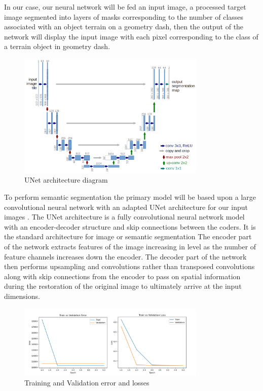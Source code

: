 \documentclass{article} %
\begin{document}
In our case, our neural network will be fed an input image, a processed target image segmented into layers of masks corresponding to the number of classes associated with an object terrain on a geometry dash, then the output of the network will display the input image with each pixel corresponding to the class of a terrain object in geometry dash. 

\begin{figure}[!h]
\begin{center}
\includegraphics[width=0.8\textwidth]{Figs/u-net-architecture.png}
\end{center}
\caption{UNet architecture diagram}
\label{fig:collision_box_issues}
\end{figure}

To perform semantic segmentation the primary model will be based upon a large convolutional neural network with an adapted UNet architecture for our input images \cite{ronneberger2015unetconvolutionalnetworksbiomedical}. The UNet architecture is a fully convolutional neural network model with an encoder-decoder structure and skip connections between the coders. It is the standard architecture for image or semantic segmentation The encoder part of the network extracts features of the image increasing in level as the number of feature channels increases down the encoder. The decoder part of the network then performs upsampling and convolutions rather than transposed convolutions along with skip connections from the encoder to pass on spatial information during the restoration of the original image to ultimately arrive at the input dimensions. 

\label{last_page}

\begin{figure}[!h]
\begin{center}
\includegraphics[width=0.8\textwidth]{Figs/train val error.png}
\end{center}
\caption{Training and Validation error and losses}
\label{fig:collision_box_issues}
\end{figure}



\end{document}
